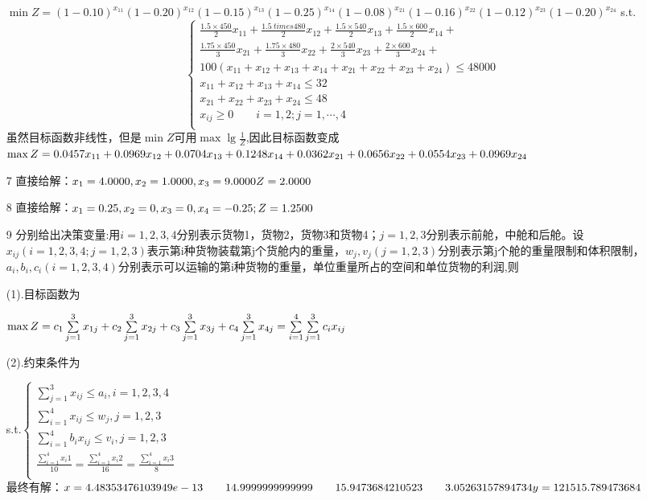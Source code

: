 \documentclass[a4paper,20pt]{article}
\begin{document}
\begin{itemize}
    
$\min Z =(1-0.10)^{x_{11}}(1-0.20)^{x_{12}}(1-0.15)^{x_{13}}(1-0.25)^{x_{14}}
(1-0.08)^{x_{21}}
(1-0.16)^{x_{22}}(1-0.12)^{x_{23}}(1-0.20)^{x_{24}}$
s.t.$$\left\{\begin{matrix}
    \frac{1.5 \times 450}{2}x_{11}+\frac{1.5 \ times 480}{2}x_{12}+\frac{1.5 \times 540}{2}x_{13}+\frac{1.5 \times 600}{2}x_{14}+\\\frac{1.75 \times 450}{3}x_{21}+\frac{1.75 \times 480}{3}x_{22}+\frac{2 \times 540}{3}x_{23}+\frac{2 \times 600}{3}x_{24}+\\100(x_{11}+x_{12}+x_{13}+x_{14}+x_{21}+x_{22}+x_{23}+x_{24})\leq 48000\\
    x_{11}+x_{12}+x_{13}+x_{14} \leq 32\\
    x_{21}+x_{22}+x_{23}+x_{24} \leq 48\\
    x_{ij}\geq 0 \qquad i=1,2;j=1,\cdots,4\\
\end{matrix}\right.$$
虽然目标函数非线性，但是$\min Z$可用$\max \lg{\frac{1}{Z}}$,因此目标函数变成
\\$\max Z =0.0457x_{11}+0.0969x_{12}+0.0704x_{13}+0.1248x_{14}+0.0362x_{21}+\\0.0656x_{22}+0.0554x_{23}+0.0969x_{24}$
\item[7]直接给解：$x_1 =
4.0000
,x_2=1.0000
,x_3=9.0000
\\Z=2.0000$
\item[8]直接给解：$
x_1=0.25,x_2=0,x_3=0,x_4=-0.25;
\\Z =1.2500$
\item[9]分别给出决策变量:用$i=1,2,3,4$分别表示货物1，货物2，货物3和货物4；$j=1,2,3$分别表示前舱，中舱和后舱。设$x_{ij}(i=1,2,3,4;j=1,2,3)$表示第i种货物装载第j个货舱内的重量，$w_j,v_j(j=1,2,3)$分别表示第j个舱的重量限制和体积限制，$a_i,b_i,c_i(i=1,2,3,4)$分别表示可以运输的第i种货物的重量，单位重量所占的空间和单位货物的利润,则
\par (1).目标函数为\par $\max Z=c_1\sum\limits_{j=1}^3x_{1j}+c_2\sum\limits_{j=1}^3x_{2j}+c_3\sum\limits_{j=1}^3x_{3j}+c_4\sum\limits_{j=1}^3x_{4j}\\=\sum\limits_{i=1}^4\sum\limits_{j=1}^3c_ix_{ij}$
\par (2).约束条件为\par s.t.$\left\{\begin{matrix}
    \sum\limits_{j=1}^3x_{ij}\leq a_i,i=1,2,3,4\\
    \sum\limits_{i=1}^4x_{ij}\leq w_j,j=1,2,3\\
    \sum\limits_{i=1}^4b_ix_{ij}\leq v_i,j=1,2,3\\
    \frac{\sum\limits_{i=1}^4x_i1}{10}=\frac{\sum\limits_{i=1}^4x_i2}{16}=\frac{\sum\limits_{i=1}^4x_i3}{8}\\
\end{matrix}\right.$
\\最终有解：$x =
4.48353476103949e-13      \qquad    14.9999999999999      \qquad    15.9473684210523      \\ \qquad   3.05263157894734
\\y =121515.789473684$

\end{itemize}
\end{document}
